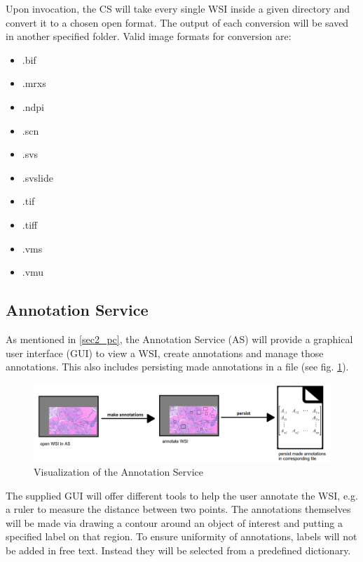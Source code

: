 Upon invocation, the CS will take every single WSI inside a given directory and convert it to a chosen open format. The output of each conversion will be saved in another specified folder. Valid image formats for conversion are:

\begin{itemize}
	\item .bif
	\item .mrxs
	\item .ndpi
	\item .scn
	\item .svs
	\item .svslide
	\item .tif
	\item .tiff
	\item .vms
	\item .vmu
\end{itemize}


\subsection{Annotation Service}
\label{sec2_as}
As mentioned in \ref{sec2_pc}, the Annotation Service (AS) will provide a graphical user interface (GUI) to view a WSI, create annotations and manage those annotations. This also includes persisting made annotations in a file (see fig. \ref{fig2_processChainB}).

\begin{figure}[H]
	\begin{center}
		\includegraphics[scale=0.2]{img/processChainB.png}
		\caption{Visualization of the Annotation Service}
		\label{fig2_processChainB}
	\end{center}
\end{figure}

The supplied GUI will offer different tools to help the user annotate the WSI, e.g. a ruler to measure the distance between two points. The annotations themselves will be made via drawing a contour around an object of interest and putting a specified label on that region. To ensure uniformity of annotations, labels will not be added in free text. Instead they will be selected from a predefined dictionary.


